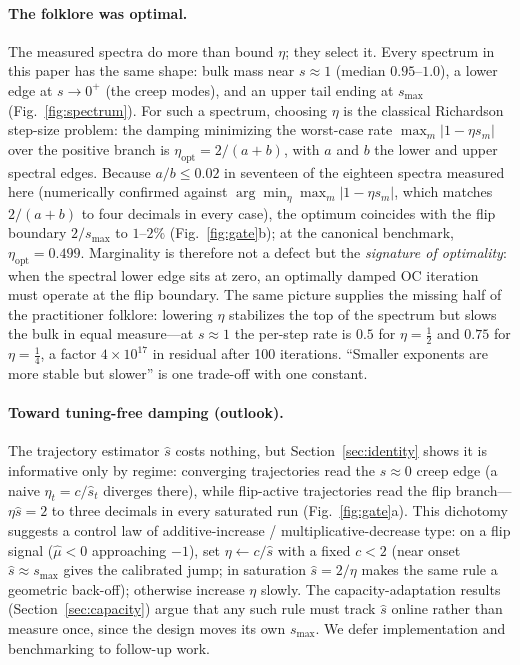 \documentclass[11pt,a4paper]{article}
\newcommand{\smax}{s_{\max}}
\begin{document}
\paragraph{The folklore was optimal.} The measured spectra do more than
bound $\eta$; they select it. Every spectrum in this paper has the same
shape: bulk mass near $s\approx1$ (median $0.95$--$1.0$), a lower edge at
$s\to0^{+}$ (the creep modes), and an upper tail ending at $\smax$
(Fig.~\ref{fig:spectrum}). For such a spectrum, choosing $\eta$ is the
classical Richardson step-size problem: the damping minimizing the
worst-case rate $\max_m|1-\eta s_m|$ over the positive branch is
$\eta_{\mathrm{opt}}=2/(a+b)$, with $a$ and $b$ the lower and upper
spectral edges. Because $a/b\le0.02$ in seventeen of the eighteen spectra
measured here (numerically confirmed against
$\arg\min_\eta\max_m|1-\eta s_m|$, which matches $2/(a+b)$ to four
decimals in every case), the optimum coincides with the flip boundary
$2/\smax$ to $1$--$2\%$ (Fig.~\ref{fig:gate}b); at the canonical
benchmark, $\eta_{\mathrm{opt}}=0.499$. Marginality is therefore not a
defect but the \emph{signature of optimality}: when the spectral lower
edge sits at zero, an optimally damped OC iteration must operate at the
flip boundary. The same picture supplies the missing half of the
practitioner folklore: lowering $\eta$ stabilizes the top of the spectrum
but slows the bulk in equal measure---at $s\approx1$ the per-step rate is
$0.5$ for $\eta=\tfrac12$ and $0.75$ for $\eta=\tfrac14$, a factor
$4\times10^{17}$ in residual after 100 iterations. ``Smaller exponents
are more stable but slower'' is one trade-off with one constant.

\paragraph{Toward tuning-free damping (outlook).} The trajectory
estimator $\hat s$ costs nothing, but Section~\ref{sec:identity} shows it
is informative only by regime: converging trajectories read the
$s\approx0$ creep edge (a naive $\eta_t=c/\hat s_t$ diverges there),
while flip-active trajectories read the flip branch---$\eta\hat s=2$ to
three decimals in every saturated run (Fig.~\ref{fig:gate}a). This
dichotomy suggests a control law of additive-increase /
multiplicative-decrease type: on a flip signal ($\hat\mu<0$ approaching
$-1$), set $\eta\leftarrow c/\hat s$ with a fixed $c<2$ (near onset
$\hat s\approx\smax$ gives the calibrated jump; in saturation
$\hat s=2/\eta$ makes the same rule a geometric back-off); otherwise
increase $\eta$ slowly. The capacity-adaptation results
(Section~\ref{sec:capacity}) argue that any such rule must track $\hat s$
online rather than measure once, since the design moves its own $\smax$.
We defer implementation and benchmarking to follow-up work.
\end{document}
